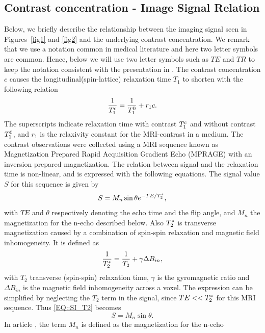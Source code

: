\documentclass[12pt,a4paper]{article}
\begin{document}
\subsection{Contrast concentration - Image Signal Relation}
Below, we briefly describe the relationship between the imaging signal 
seen in Figures~\ref{fig1} and \ref{fig2} and the underlying contrast 
concentration. We remark that we use a notation common in medical literature and here two letter symbols are common. Hence, below we will use two letter symbols such as $TE$ and $TR$ to keep the notation consistent with the presentation in \cite{GOWLAND, MPRAGE}.   
The contrast concentration $c$ causes the longitudinal(spin-lattice) relaxation time $T_{1}$ to shorten with the following relation
\begin{equation}
\frac{1}{T_{1}\sp{c}} = \frac{1}{T_{1}\sp{0}} + r_{1}c .
\label{EQ::contrast}
\end{equation}
The superscripts indicate relaxation time with contrast $T_{1}\sp{c}$ and without contrast $T_{1}\sp{0}$, and $r_1$ is the relaxivity constant for the MRI-contrast in a medium. 
The contrast observations were collected using a MRI sequence known as  Magnetization Prepared Rapid Acquisition Gradient Echo (MPRAGE) with an inversion prepared magnetization. The relation between signal and the relaxation time is non-linear, and is expressed with the following equations. The signal value $S$ for this sequence is given by
\begin{equation}
S = M_{n} \sin \theta e\sp{ - TE/T_2\sp{*} },
\label{EQ::SI_T2}
\end{equation}
with $TE$ and $\theta$ respectively denoting the echo time and the flip angle, and $M_{n}$ the magnetization for the n-echo described below. 
Also $T_2\sp{*}$ is transverse magnetization caused by a combination of spin-spin relaxation and magnetic field inhomogeneity. It is defined as 
\begin{equation}
\frac{1}{T_2\sp{*}} = \frac{1}{T_2} + \gamma \Delta B_{in} ,
\end{equation}
with $T_2$ transverse (spin-spin) relaxation time, $\gamma$ is the gyromagnetic ratio and $\Delta B_{in}$ is the magnetic field inhomogeneity across a voxel. The expression can be simplified by neglecting the $T_2$ term in the signal, since $TE <<T_2\sp{*}$ for this MRI sequence. Thus \eqref{EQ::SI_T2} becomes 
\begin{equation}
S = M_{n} \sin \theta.
\label{EQ::SI}
\end{equation}
In article \cite{GOWLAND}, the term $M_n$ is defined as the magnetization for the n-echo 
\end{document}
